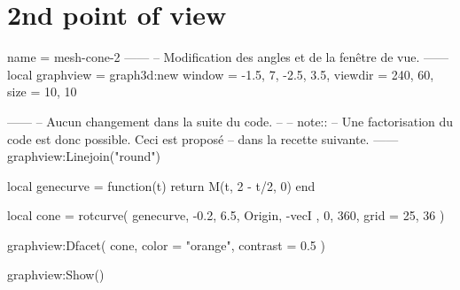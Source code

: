 \documentclass[varwidth]{standalone}
\begin{document}
\section*{2nd point of view}

\begin{luadraw}{name = mesh-cone-2}
------
-- Modification des angles et de la fenêtre de vue.
------
local graphview = graph3d:new{
  window  = {-1.5, 7, -2.5, 3.5},
  viewdir = {240, 60},
  size    = {10, 10}
}

------
-- Aucun changement dans la suite du code.
--
-- note::
--     Une factorisation du code est donc possible. Ceci est proposé
--     dans la recette suivante.
------
graphview:Linejoin("round")

local genecurve = function(t)
  return M(t, 2 - t/2, 0)
end

local cone = rotcurve(
  genecurve,
  -0.2, 6.5,
  {
    Origin, -vecI
  },
  0, 360,
  {
    grid = {25, 36}
  })

graphview:Dfacet(
  cone,
  {
    color  = "orange",
    contrast = 0.5
  })

graphview:Show()
\end{luadraw}
\end{document}
